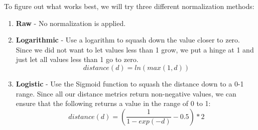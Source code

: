 \documentclass{article}
\begin{document}
To figure out what works best, we will try three different normalization methods:
\begin{enumerate}
	\item \textbf{Raw} - No normalization is applied.
    
    \item \textbf{Logarithmic} - Use a logarithm to squash down the value closer to zero. Since we did not want to let values less than 1 grow, we put a hinge at 1 and just let all values less than 1 go to zero.
		$$ distance(d) = ln(max(1, d)) $$
        
    \item \textbf{Logistic} - Use the Sigmoid function to squash the distance down to a 0-1 range. Since all our distance metrics return non-negative values, we can ensure that the following returns a value in the range of 0 to 1:
	    $$ distance(d) = (\frac{1}{1 - exp(-d)} - 0.5) * 2 $$
\end{enumerate}
\end{document}
